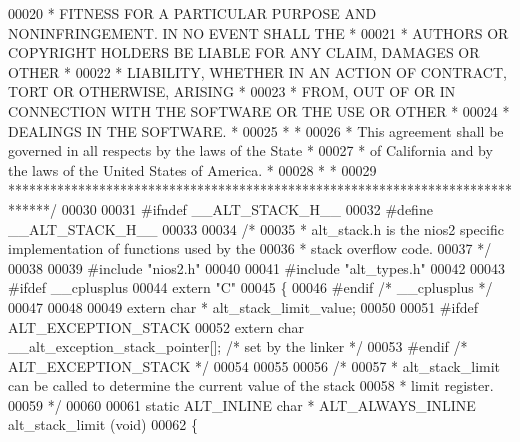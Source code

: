 \begin{DoxyCode}
00020 \textcolor{comment}{* FITNESS FOR A PARTICULAR PURPOSE AND NONINFRINGEMENT. IN NO EVENT SHALL THE *}
00021 \textcolor{comment}{* AUTHORS OR COPYRIGHT HOLDERS BE LIABLE FOR ANY CLAIM, DAMAGES OR OTHER      *}
00022 \textcolor{comment}{* LIABILITY, WHETHER IN AN ACTION OF CONTRACT, TORT OR OTHERWISE, ARISING     *}
00023 \textcolor{comment}{* FROM, OUT OF OR IN CONNECTION WITH THE SOFTWARE OR THE USE OR OTHER         *}
00024 \textcolor{comment}{* DEALINGS IN THE SOFTWARE.                                                   *}
00025 \textcolor{comment}{*                                                                             *}
00026 \textcolor{comment}{* This agreement shall be governed in all respects by the laws of the State   *}
00027 \textcolor{comment}{* of California and by the laws of the United States of America.              *}
00028 \textcolor{comment}{*                                                                             *}
00029 \textcolor{comment}{******************************************************************************/}
00030 
00031 \textcolor{preprocessor}{#ifndef \_\_ALT\_STACK\_H\_\_}
00032 \textcolor{preprocessor}{#define \_\_ALT\_STACK\_H\_\_}
00033 
00034 \textcolor{comment}{/*}
00035 \textcolor{comment}{ * alt\_stack.h is the nios2 specific implementation of functions used by the}
00036 \textcolor{comment}{ * stack overflow code.}
00037 \textcolor{comment}{ */}
00038 
00039 \textcolor{preprocessor}{#include "nios2.h"}
00040 
00041 \textcolor{preprocessor}{#include "alt_types.h"}
00042 
00043 \textcolor{preprocessor}{#ifdef \_\_cplusplus}
00044 \textcolor{keyword}{extern} \textcolor{stringliteral}{"C"}
00045 \{
00046 \textcolor{preprocessor}{#endif }\textcolor{comment}{/* \_\_cplusplus */}\textcolor{preprocessor}{}
00047 
00048 
00049 \textcolor{keyword}{extern} \textcolor{keywordtype}{char} * alt_stack_limit_value;
00050 
00051 \textcolor{preprocessor}{#ifdef ALT\_EXCEPTION\_STACK}
00052 \textcolor{keyword}{extern} \textcolor{keywordtype}{char} \_\_alt\_exception\_stack\_pointer[];  \textcolor{comment}{/* set by the linker */}
00053 \textcolor{preprocessor}{#endif }\textcolor{comment}{/* ALT\_EXCEPTION\_STACK */}\textcolor{preprocessor}{}
00054 
00055 
00056 \textcolor{comment}{/*}
00057 \textcolor{comment}{ * alt\_stack\_limit can be called to determine the current value of the stack}
00058 \textcolor{comment}{ * limit register.}
00059 \textcolor{comment}{ */}
00060 
00061 \textcolor{keyword}{static} ALT_INLINE \textcolor{keywordtype}{char} * ALT_ALWAYS_INLINE alt_stack_limit (\textcolor{keywordtype}{void})
00062 \{

\end{DoxyCode}
